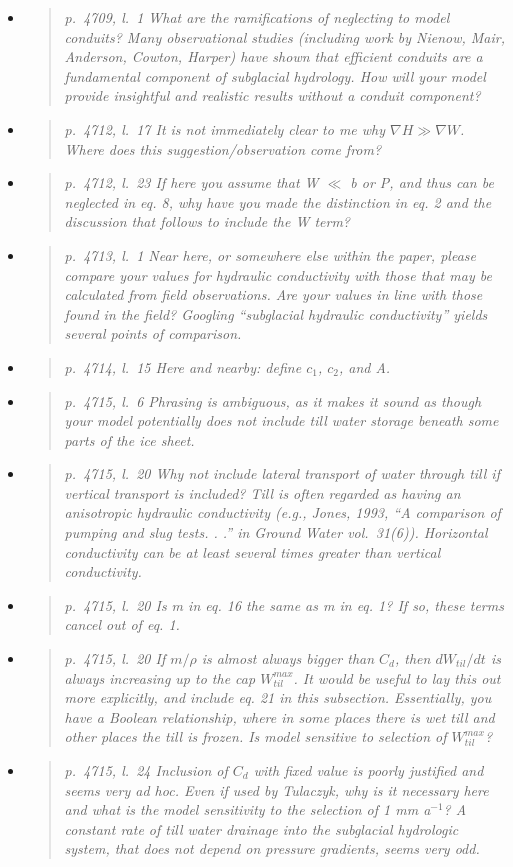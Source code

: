 \documentclass[11pt,reqno]{amsart}
\newcommand{\reply}[2]{
\medskip\medskip
\item  \begin{quote}
\emph{#1}
\end{quote}

\medskip
\noindent #2}
\begin{document}
\begin{itemize}
\reply{p.~4709, l.~1 What are the ramifications of neglecting to model conduits? Many observational studies (including work by Nienow, Mair, Anderson, Cowton, Harper) have
shown that efficient conduits are a fundamental component of subglacial hydrology.
How will your model provide insightful and realistic results without a conduit component?}
{}

\reply{p.~4712, l.~17 It is not immediately clear to me why $\nabla H \gg \nabla W$. Where does this
suggestion/observation come from?}
{}

\reply{p.~4712, l.~23 If here you assume that W $\ll$ b or P, and thus can be neglected in eq. 8,
why have you made the distinction in eq. 2 and the discussion that follows to include
the W term?}
{}

\reply{p.~4713, l.~1 Near here, or somewhere else within the paper, please compare your
values for hydraulic conductivity with those that may be calculated from field observations. Are your values in line with those found in the field? Googling “subglacial
hydraulic conductivity” yields several points of comparison.}
{}

\reply{p.~4714, l.~15 Here and nearby: define $c_1$, $c_2$, and A.}
{}

\reply{p.~4715, l.~6 Phrasing is ambiguous, as it makes it sound as though your model
potentially does not include till water storage beneath some parts of the ice sheet.}
{}

\reply{p.~4715, l.~20 Why not include lateral transport of water through till if vertical transport
is included? Till is often regarded as having an anisotropic hydraulic conductivity (e.g.,
Jones, 1993, “A comparison of pumping and slug tests. . .” in Ground Water vol.~31(6)).
Horizontal conductivity can be at least several times greater than vertical conductivity.}
{}

\reply{p.~4715, l.~20 Is m in eq. 16 the same as m in eq. 1? If so, these terms cancel out of
eq. 1.}
{}

\reply{p.~4715, l.~20 If $m/\rho$ is almost always bigger than $C_d$, then $dW_{til}/dt$ is always
increasing up to the cap $W_{til}^{max}$. It would be useful to lay this out more explicitly,
and include eq. 21 in this subsection. Essentially, you have a Boolean relationship,
where in some places there is wet till and other places the till is frozen. Is model
sensitive to selection of $W_{til}^{max}$?}
{}

\reply{p.~4715, l.~24 Inclusion of $C_d$ with fixed value is poorly justified and seems very
ad hoc. Even if used by Tulaczyk, why is it necessary here and what is the model
sensitivity to the selection of 1 mm a$^{-1}$? A constant rate of till water drainage into the
subglacial hydrologic system, that does not depend on pressure gradients, seems very
odd.}
{}


\end{itemize}
\end{document}
